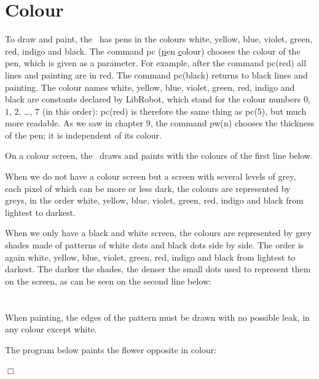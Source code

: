\section{Colour}

To draw and paint, the \robot\ has pens in the colours white, yellow, blue, violet, green,
red, indigo and black. The command {\idt pc} (\underline{p}en \underline{c}olour) chooses the colour of the pen, which is given as a parameter. For example, after the command {\idt pc(red)}
all lines and painting are in red. The command {\idt pc(black)} returns
to black lines and painting. The colour names {\idt white}, {\idt yellow}, {\idt blue},
{\idt violet}, {\idt green}, {\idt red}, {\idt indigo} and {\idt black} are constants
declared by {\idt LibRobot}, which stand for the colour numbers $0$, $1$, $2$, \ldots, $7$
(in this order): {\idt pc(red)} is therefore the same thing as {\idt pc(5)}, but much more
readable. As we saw in chapter 9, the command {\idt pw(n)} chooses
the thickness of the pen; it is independent of its colour.

On a colour screen, the \robot\ draws and paints with the colours of the first
line below.

When we do not have a colour screen but a screen with several levels of grey,
each pixel of which can be more or less dark, the
colours are represented by greys, in the order white,
yellow, blue, violet, green, red, indigo and black from lightest to darkest.

When we only have a black and white screen, the colours are represented by
grey shades made of patterns of white dots and black dots side by side. The order is
again white,
yellow, blue, violet, green, red, indigo and black from lightest to darkest. The darker the shades,
the denser the small dots used to represent them on the screen, as
can be seen on the second line below:\\[1.8cm]
\ \\[1.8cm]
\ \\

When painting, the edges of the pattern must be drawn with no possible leak, in any colour except white.

\begin{exemple}{\rm
 The program below paints the flower opposite in colour:\\[5cm]
 \vspace*{-5cm}
 
\noindent $\Box$ }\end{exemple}

